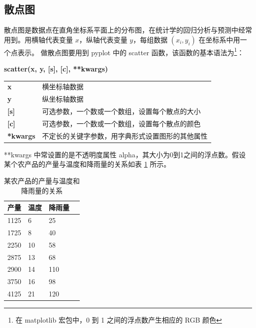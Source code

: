 \subsection{散点图}

散点图是数据点在直角坐标系平面上的分布图，在统计学的回归分析与预测中经常用到。用横轴代表变量 $x$，纵轴代表变量 $y$，每组数据 $(x_i, y_i)$ 在坐标系中用一个点表示。
做散点图要用到 pyplot 中的 scatter 函数，该函数的基本语法为\footnote{在 matplotlib 宏包中，0 到 1 之间的浮点数产生相应的 RGB 颜色}：

\begin{center}
\begin{tcolorbox}[title = scatter 函数的语法]
\textbf{scatter(x, y, [s], [c], **kwargs)}
\tcblower
\vspace{10pt}

\begin{tcboutputlisting}
\begin{tabular}{>{\bfseries}ll}
  x &横坐标轴数据\\
  y & 纵坐标轴数据\\

[s] &可选参数，一个数或一个数组，设置每个散点的大小\\

[c] &可选参数，一个数或一个数组，设置每个散点的颜色\\
**kwargs &不定长的关键字参数，用字典形式设置图形的其他属性
\end{tabular}
\end{tcboutputlisting}
\tcbuselistingtext

\end{tcolorbox}
\end{center}

**kwargs 中常设置的是不透明度属性 alpha，其大小为0到1之间的浮点数。假设某个农产品的产量与温度和降雨量的关系如表 \ref{table:scatter} 所示。

\begin{table}[!ht]
\centering
\renewcommand{\arraystretch}{1.2}
\caption{某农产品的产量与温度和降雨量的关系}\label{table:scatter}
\begin{tabular}{|l|l|l|l|}
\hline
产量 & 温度 & 降雨量 \\ \hline
1125 & 6 & 25 \\ \hline
1725 & 8 & 40 \\ \hline
2250 & 10 & 58 \\ \hline
2875 & 13 & 68 \\ \hline
2900 & 14 & 110 \\ \hline
3750 & 16 & 98 \\ \hline
4125 & 21 & 120 \\ \hline

\end{tabular}
\end{table}

